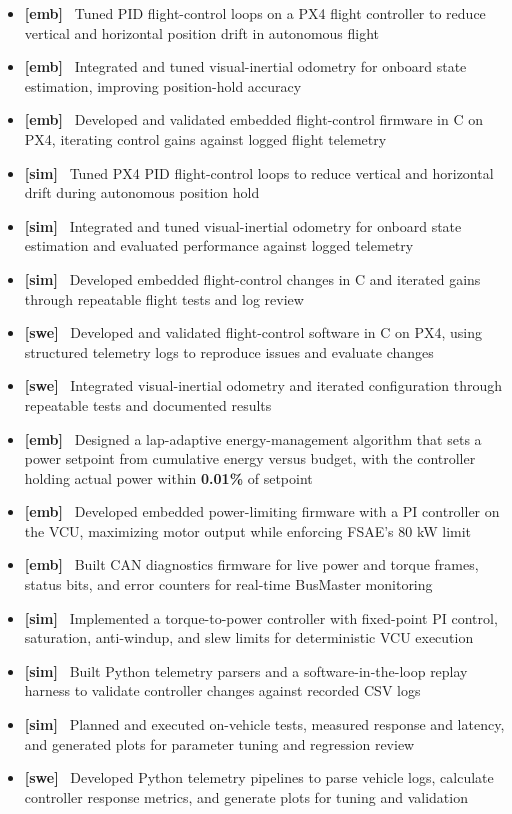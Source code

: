 \documentclass[10pt,letterpaper]{article}
\newcommand{\vtag}[1]{\textbf{[#1]}~}
\begin{document}
\begin{itemize}
  \item \vtag{emb} Tuned PID flight-control loops on a PX4 flight controller to reduce vertical and horizontal position drift in autonomous flight
  \item \vtag{emb} Integrated and tuned visual-inertial odometry for onboard state estimation, improving position-hold accuracy
  \item \vtag{emb} Developed and validated embedded flight-control firmware in C on PX4, iterating control gains against logged flight telemetry
  \item \vtag{sim} Tuned PX4 PID flight-control loops to reduce vertical and horizontal drift during autonomous position hold
  \item \vtag{sim} Integrated and tuned visual-inertial odometry for onboard state estimation and evaluated performance against logged telemetry
  \item \vtag{sim} Developed embedded flight-control changes in C and iterated gains through repeatable flight tests and log review
  \item \vtag{swe} Developed and validated flight-control software in C on PX4, using structured telemetry logs to reproduce issues and evaluate changes
  \item \vtag{swe} Integrated visual-inertial odometry and iterated configuration through repeatable tests and documented results
\end{itemize}

\entryspace

\orgline{\spartanracing}
\begin{itemize}
  \item \vtag{emb} Designed a lap-adaptive energy-management algorithm that sets a power setpoint from cumulative energy versus budget, with the controller holding actual power within \textbf{0.01\%} of setpoint
  \item \vtag{emb} Developed embedded power-limiting firmware with a PI controller on the VCU, maximizing motor output while enforcing FSAE's 80 kW limit
  \item \vtag{emb} Built CAN diagnostics firmware for live power and torque frames, status bits, and error counters for real-time BusMaster monitoring
  \item \vtag{sim} Implemented a torque-to-power controller with fixed-point PI control, saturation, anti-windup, and slew limits for deterministic VCU execution
  \item \vtag{sim} Built Python telemetry parsers and a software-in-the-loop replay harness to validate controller changes against recorded CSV logs
  \item \vtag{sim} Planned and executed on-vehicle tests, measured response and latency, and generated plots for parameter tuning and regression review
  \item \vtag{swe} Developed Python telemetry pipelines to parse vehicle logs, calculate controller response metrics, and generate plots for tuning and validation
\end{itemize}
\end{document}
